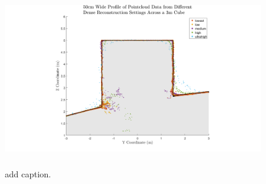 \begin{figure}[H]
	\centering
	\includegraphics[height = 3in]{../fig/boxprofile}

	\caption{add caption.}
	\label{fig:boxplot}
\end{figure}